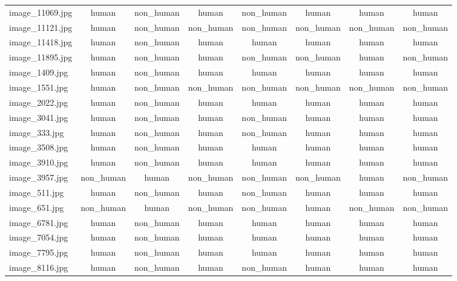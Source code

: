 \documentclass[hidelinks, 11pt]{article}
\begin{document}
\begin{longtable}{@{}lccccccc@{}}
image\_11069.jpg & human     & non\_human & human     & non\_human & human     & human     & human     \\
image\_11121.jpg & human     & non\_human & non\_human & non\_human & non\_human & non\_human & non\_human \\
image\_11418.jpg & human     & non\_human & human     & human     & human     & human     & human     \\
image\_11895.jpg & human     & non\_human & human     & non\_human & non\_human & human     & non\_human \\
image\_1409.jpg  & human     & non\_human & human     & human     & human     & human     & human     \\
image\_1551.jpg  & human     & non\_human & non\_human & non\_human & non\_human & non\_human & non\_human \\
image\_2022.jpg  & human     & non\_human & human     & human     & human     & human     & human     \\
image\_3041.jpg  & human     & non\_human & human     & non\_human & human     & human     & human     \\
image\_333.jpg   & human     & non\_human & human     & non\_human & human     & human     & human     \\
image\_3508.jpg  & human     & non\_human & human     & human     & human     & human     & human     \\
image\_3910.jpg  & human     & non\_human & human     & human     & human     & human     & human     \\
image\_3957.jpg  & non\_human & human     & non\_human & non\_human & non\_human & human     & non\_human \\
image\_511.jpg   & human     & non\_human & human     & non\_human & human     & human     & human     \\
image\_651.jpg   & non\_human & human     & non\_human & non\_human & human     & non\_human & non\_human \\
image\_6781.jpg  & human     & non\_human & human     & human     & human     & human     & human     \\
image\_7054.jpg  & human     & non\_human & human     & human     & human     & human     & human     \\
image\_7795.jpg  & human     & non\_human & human     & human     & human     & human     & human     \\
image\_8116.jpg  & human     & non\_human & human     & non\_human & human     & human     & human     \\

\end{longtable}
\end{document}
